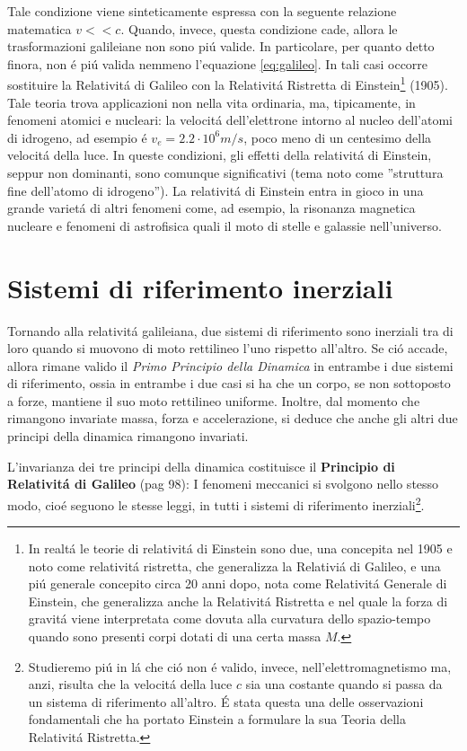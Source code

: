 \documentclass[17pt]{extarticle}
\begin{document}
Tale condizione viene sinteticamente espressa con la seguente relazione matematica $v<<c$. Quando, invece, questa condizione cade, allora le trasformazioni galileiane non sono pi\'u valide. In particolare, per quanto detto finora, non \'e pi\'u valida nemmeno l'equazione  \ref{eq:galileo}. In tali casi occorre sostituire la Relativit\'a di Galileo con la Relativit\'a Ristretta di Einstein\footnote{In realt\'a le teorie di relativit\'a di Einstein sono due, una concepita nel 1905 e noto come relativit\'a ristretta, che generalizza la Relativi\'a di Galileo, e una pi\'u generale concepito circa 20 anni dopo, nota  come Relativit\'a Generale di Einstein, che generalizza anche la Relativit\'a Ristretta e nel quale la forza di gravit\'a viene interpretata come dovuta alla curvatura dello spazio-tempo quando sono presenti corpi dotati di una certa massa $M$.} (1905). Tale teoria trova applicazioni non nella vita ordinaria, ma, tipicamente, in fenomeni atomici e nucleari: la velocit\'a dell'elettrone intorno al nucleo dell'atomi di idrogeno, ad esempio \'e $v_e = 2.2\cdot 10^6 m/s$, poco meno di un centesimo della velocit\'a della luce. In queste condizioni, gli effetti della relativit\'a di Einstein, seppur non dominanti, sono comunque significativi (tema noto come ''struttura fine dell'atomo di idrogeno''). La relativit\'a di Einstein entra in gioco in una grande variet\'a di altri fenomeni come, ad esempio, la risonanza magnetica nucleare e fenomeni di astrofisica quali il moto di stelle e galassie nell'universo.


\section{Sistemi di riferimento inerziali}
	
Tornando alla relativit\'a galileiana, due sistemi di riferimento sono inerziali tra di loro quando si muovono di moto rettilineo l'uno rispetto all'altro. Se ci\'o accade, allora rimane valido il \emph{Primo Principio della Dinamica} in entrambe i due sistemi di riferimento, ossia in entrambe i due casi si ha che un corpo, se non sottoposto a forze, mantiene il suo moto rettilineo uniforme. Inoltre, dal momento che rimangono invariate massa, forza e accelerazione, si deduce che anche gli altri due principi della dinamica rimangono invariati.

L'invarianza dei tre principi della dinamica costituisce il {\bf Principio di Relativit\'a di Galileo}  (pag 98): I fenomeni meccanici si svolgono nello stesso modo, cio\'e seguono le stesse leggi, in tutti i sistemi di riferimento inerziali\footnote{Studieremo pi\'u in l\'a che ci\'o non \'e valido, invece, nell'elettromagnetismo ma, anzi, risulta che la velocit\'a della luce $c$ sia una costante quando si passa da un sistema di riferimento all'altro. \'E stata questa una delle osservazioni fondamentali che ha portato Einstein a formulare la sua Teoria della Relativit\'a Ristretta.}.
\end{document}
